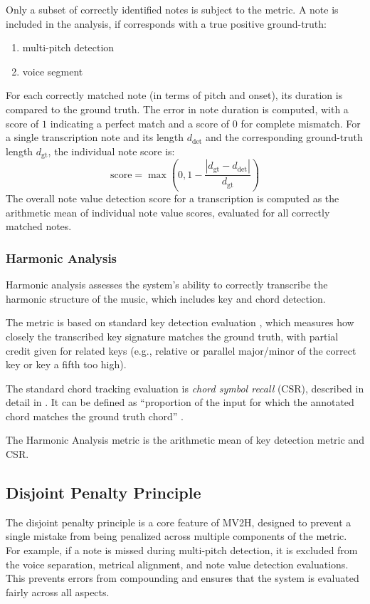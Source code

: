 Only a subset of correctly identified notes is subject to the metric. A note is included in the analysis, if corresponds with a true positive ground-truth: \begin{enumerate}
	\item multi-pitch detection
	\item voice segment
\end{enumerate}

For each correctly matched note (in terms of pitch and onset), its duration is compared to the ground truth. The error in note duration is computed, with a score of $1$ indicating a perfect match and a score of $0$ for complete mismatch. For a single transcription note and its length $d_{\textrm{det}}$ and the corresponding ground-truth length $d_{\textrm{gt}}$, the individual note score is: \[\textrm{score} = \max\left(0, 1 - \frac{\left|d_{\textrm{gt}} - d_{\textrm{det}}\right|}{d_{\textrm{gt}}}\right)\] The overall note value detection score for a transcription is computed as the arithmetic mean of individual note value scores, evaluated for all correctly matched notes. 

\subsubsection{Harmonic Analysis}

Harmonic analysis assesses the system’s ability to correctly transcribe the harmonic structure of the music, which includes key and chord detection. 

The metric is based on standard key detection evaluation \cite{Raffel2014}, which measures how closely the transcribed key signature matches the ground truth, with partial credit given for related keys (e.g., relative or parallel major/minor of the correct key or key a fifth too high).

The standard chord tracking evaluation is \emph{chord symbol recall} (CSR), described in detail in \cite{Harte2010}. It can be defined as ``proportion of the input for which the annotated chord matches the ground truth chord'' \cite{McLeod2018}.

The Harmonic Analysis metric is the arithmetic mean of key detection metric and CSR.

\subsection{Disjoint Penalty Principle}

The disjoint penalty principle is a core feature of MV2H, designed to prevent a single mistake from being penalized across multiple components of the metric. For example, if a note is missed during multi-pitch detection, it is excluded from the voice separation, metrical alignment, and note value detection evaluations. This prevents errors from compounding and ensures that the system is evaluated fairly across all aspects.

